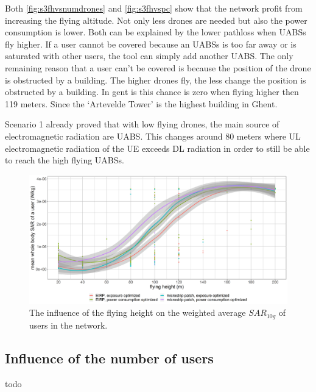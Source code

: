 Both \ref{fig:s3fhvsnumdrones} and \ref{fig:s3fhvspc} show that the network profit from increasing the flying altitude. 
Not only less drones are needed but also the power consumption is lower. Both can be explained by the lower pathloss when \gls{UABS}s fly higher.
If a user cannot be covered because an \gls{UABS}s is too far away or is saturated with other users, 
the tool can simply add another \gls{UABS}. The only remaining reason that a user can’t be covered is because the position of 
the drone is obstructed by a building. The higher drones fly, the less change the position is obstructed by a building. 
In gent is this chance is zero when flying higher then 119 meters. Since the `Artevelde Tower' is the highest building in Ghent.

Scenario 1 already proved that with low flying drones, the main source of electromagnetic radiation are \gls{UABS}. 
This changes around 80 meters where \gls{UL} electromagnetic radiation of the \gls{UE}
 exceeds \gls{DL} radiation in order to still be able to reach the high flying \gls{UABS}s.

\begin{figure}[]
  \includegraphics[width=\textwidth]{../results/s3/fhvssar.png}
  \caption{The influence of the flying height on the weighted average $SAR_{10g}$ of users in the network.}
  \label{fig:s3fhvssar}
\end{figure}

\subsection{Influence of the number of users}
todo